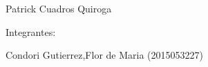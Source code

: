 \documentclass[12pt]{article}
\begin{document}
\begin{titlepage}
\begin{center}
\vspace*{0.1in}
\begin{large}
 Patrick Cuadros Quiroga\\
\end{large}

\vspace*{0.2in}
\vspace*{0.1in}
\begin{large}
Integrantes: \\
\begin{flushleft}

Condori Gutierrez,Flor de Maria            	\hfill	(2015053227) \\

\end{flushleft}
\end{large}
\end{center}

\end{titlepage}
\end{document}
